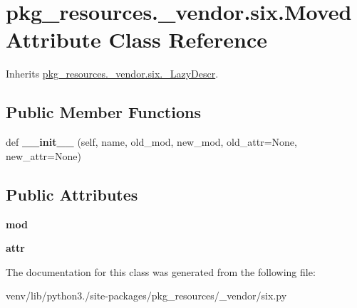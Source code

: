 \hypertarget{classpkg__resources_1_1__vendor_1_1six_1_1_moved_attribute}{}\section{pkg\+\_\+resources.\+\_\+vendor.\+six.\+Moved\+Attribute Class Reference}
\label{classpkg__resources_1_1__vendor_1_1six_1_1_moved_attribute}


Inherits \hyperlink{classpkg__resources_1_1__vendor_1_1six_1_1___lazy_descr}{pkg\+\_\+resources.\+\_\+vendor.\+six.\+\_\+\+Lazy\+Descr}.

\subsection*{Public Member Functions}
\begin{DoxyCompactItemize}
\item 
\mbox{\label{classpkg__resources_1_1__vendor_1_1six_1_1_moved_attribute_aa41d4762e967c35dc73c6c525ec90824}} 
def {\bfseries \+\_\+\+\_\+init\+\_\+\+\_\+} (self, name, old\+\_\+mod, new\+\_\+mod, old\+\_\+attr=None, new\+\_\+attr=None)
\end{DoxyCompactItemize}
\subsection*{Public Attributes}
\begin{DoxyCompactItemize}
\item 
\mbox{\label{classpkg__resources_1_1__vendor_1_1six_1_1_moved_attribute_a0c870bc615e12471cd8fdf4f55d313fd}} 
{\bfseries mod}
\item 
\mbox{\label{classpkg__resources_1_1__vendor_1_1six_1_1_moved_attribute_a02986b7414737959692fa5c1f0a70970}} 
{\bfseries attr}
\end{DoxyCompactItemize}


The documentation for this class was generated from the following file\+:\begin{DoxyCompactItemize}
\item 
venv/lib/python3./site-\/packages/pkg\+\_\+resources/\+\_\+vendor/six.\+py\end{DoxyCompactItemize}
